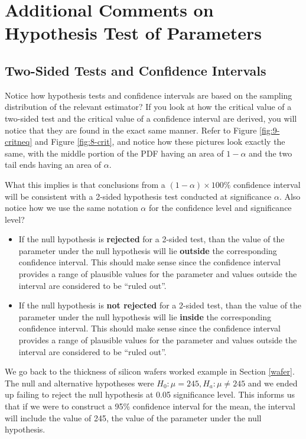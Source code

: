 \documentclass[
]{book}
\begin{document}
\hypertarget{infcomments}{%
\section{Additional Comments on Hypothesis Test of Parameters}\label{infcomments}}

\hypertarget{inference}{%
\subsection{Two-Sided Tests and Confidence Intervals}\label{inference}}

Notice how hypothesis tests and confidence intervals are based on the sampling distribution of the relevant estimator? If you look at how the critical value of a two-sided test and the critical value of a confidence interval are derived, you will notice that they are found in the exact same manner. Refer to Figure \ref{fig:9-critneq} and Figure \ref{fig:8-crit}, and notice how these pictures look exactly the same, with the middle portion of the PDF having an area of \(1-\alpha\) and the two tail ends having an area of \(\alpha\).

What this implies is that conclusions from a \((1-\alpha) \times 100\%\) confidence interval will be consistent with a 2-sided hypothesis test conducted at significance \(\alpha\). Also notice how we use the same notation \(\alpha\) for the confidence level and significance level?

\begin{itemize}
\item
  If the null hypothesis is \textbf{rejected} for a 2-sided test, than the value of the parameter under the null hypothesis will lie \textbf{outside} the corresponding confidence interval. This should make sense since the confidence interval provides a range of plausible values for the parameter and values outside the interval are considered to be ``ruled out''.
\item
  If the null hypothesis is \textbf{not rejected} for a 2-sided test, than the value of the parameter under the null hypothesis will lie \textbf{inside} the corresponding confidence interval. This should make sense since the confidence interval provides a range of plausible values for the parameter and values outside the interval are considered to be ``ruled out''.
\end{itemize}

We go back to the thickness of silicon wafers worked example in Section \ref{wafer}. The null and alternative hypotheses were \(H_0: \mu = 245, H_a: \mu \neq 245\) and we ended up failing to reject the null hypothesis at 0.05 significance level. This informs us that if we were to construct a 95\% confidence interval for the mean, the interval will include the value of 245, the value of the parameter under the null hypothesis.
\end{document}
